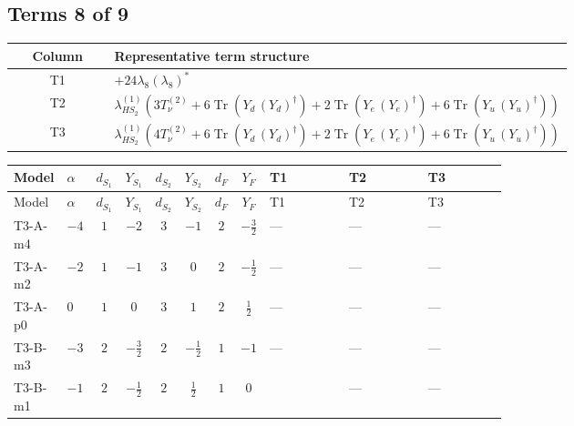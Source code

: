 \documentclass[8pt]{article}
\begin{document}
\begin{landscape}
\subsection*{Terms 8 of 9}
\begin{center}
\begin{tabular}{@{}c >{\raggedright\arraybackslash}p{0.82\linewidth}@{}}
\toprule
Column & Representative term structure \\
\midrule
T1 & \(\displaystyle +24 {\lambda_{8}} \left({\lambda_{8}}\right)^{*}\) \\
\midrule
T2 & \(\displaystyle {\lambda_{HS_2}^{(1)}} (3 T_{\nu}^{(2)}+6 \operatorname{Tr}\!\left({Y_d}\,\left({Y_d}\right)^{\dagger}\right)+2 \operatorname{Tr}\!\left({Y_e}\,\left({Y_e}\right)^{\dagger}\right)+6 \operatorname{Tr}\!\left({Y_u}\,\left({Y_u}\right)^{\dagger}\right))\) \\
\midrule
T3 & \(\displaystyle {\lambda_{HS_2}^{(1)}} (4 T_{\nu}^{(2)}+6 \operatorname{Tr}\!\left({Y_d}\,\left({Y_d}\right)^{\dagger}\right)+2 \operatorname{Tr}\!\left({Y_e}\,\left({Y_e}\right)^{\dagger}\right)+6 \operatorname{Tr}\!\left({Y_u}\,\left({Y_u}\right)^{\dagger}\right))\) \\
\midrule
\bottomrule
\end{tabular}
\end{center}
\smallskip
\tiny
\begin{longtable}{@{}llcccccc >{\raggedright\arraybackslash}p{0.21\linewidth} >{\raggedright\arraybackslash}p{0.21\linewidth} >{\raggedright\arraybackslash}p{0.21\linewidth}@{}}
\toprule
Model & $\alpha$ & $d_{S_1}$ & $Y_{S_1}$ & $d_{S_2}$ & $Y_{S_2}$ & $d_F$ & $Y_F$ & T1 & T2 & T3 \\
\midrule
\endfirsthead
\toprule
Model & $\alpha$ & $d_{S_1}$ & $Y_{S_1}$ & $d_{S_2}$ & $Y_{S_2}$ & $d_F$ & $Y_F$ & T1 & T2 & T3 \\
\midrule
\endhead
T3-A-m4 & $-4$ & $1$ & $-2$ & $3$ & $-1$ & $2$ & $-\frac{3}{2}$ & --- & --- & --- \\
\midrule
T3-A-m2 & $-2$ & $1$ & $-1$ & $3$ & $0$ & $2$ & $-\frac{1}{2}$ & --- & --- & --- \\
\midrule
T3-A-p0 & $0$ & $1$ & $0$ & $3$ & $1$ & $2$ & $\frac{1}{2}$ & --- & --- & --- \\
\midrule
T3-B-m3 & $-3$ & $2$ & $-\frac{3}{2}$ & $2$ & $-\frac{1}{2}$ & $1$ & $-1$ & --- & --- & --- \\
\midrule
T3-B-m1 & $-1$ & $2$ & $-\frac{1}{2}$ & $2$ & $\frac{1}{2}$ & $1$ & $0$ & \scriptsize\adjustbox{max width=\linewidth}{$\begin{gathered} +24 {\lambda_{8}} \left({\lambda_{8}}\right)^{*}\end{gathered}$} & --- & --- \\

\end{longtable}
\end{landscape}
\end{document}
